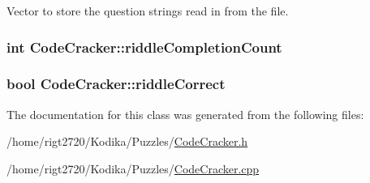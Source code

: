 Vector to store the question strings read in from the file. 

\hypertarget{classCodeCracker_aca60d7cc01bda0ec6782984e46b9b357}{
\subsubsection[{riddle\-Completion\-Count}]{\setlength{\rightskip}{0pt plus 5cm}int Code\-Cracker\-::riddle\-Completion\-Count\hspace{0.3cm}{\ttfamily [private]}}}\label{classCodeCracker_aca60d7cc01bda0ec6782984e46b9b357}
\hypertarget{classCodeCracker_ab497c5b666243b85ec3c754590ee7450}{
\subsubsection[{riddle\-Correct}]{\setlength{\rightskip}{0pt plus 5cm}bool Code\-Cracker\-::riddle\-Correct\hspace{0.3cm}{\ttfamily [private]}}}\label{classCodeCracker_ab497c5b666243b85ec3c754590ee7450}


The documentation for this class was generated from the following files\-:\begin{DoxyCompactItemize}
\item 
/home/rigt2720/\-Kodika/\-Puzzles/\hyperlink{CodeCracker_8h}{Code\-Cracker.\-h}\item 
/home/rigt2720/\-Kodika/\-Puzzles/\hyperlink{CodeCracker_8cpp}{Code\-Cracker.\-cpp}\end{DoxyCompactItemize}
